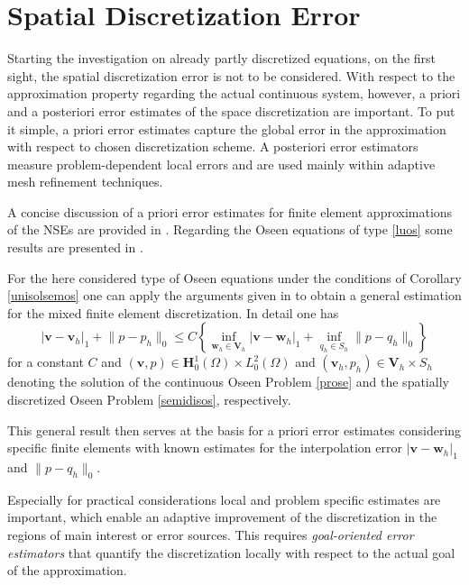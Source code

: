\documentclass[a4paper,10pt,BCOR=15mm]{scrbook}
\providecommand{\abs}[1]{\lvert#1\rvert}
\providecommand{\norm}[1]{\lVert#1 \rVert}
\begin{document}
\section{Spatial Discretization Error}
Starting the investigation on already partly discretized equations, on the first sight, the spatial discretization error is not to be considered. With respect to the approximation property regarding the actual continuous system, however, a priori and a posteriori error estimates of the space discretization are important. To put it simple, a priori error estimates capture the global error in the approximation with respect to chosen discretization scheme. A posteriori error estimators measure problem-dependent local errors and are used mainly within adaptive mesh refinement techniques.

A concise discussion of a priori error estimates for finite element approximations of the NSEs are provided in \cite[Ch. 4]{gira}. Regarding the Oseen equations of type \eqref{luos} some results are presented in \cite{cokasc}. 

For the here considered type of Oseen equations under the conditions of Corollary \ref{unisolsemos} one can apply the arguments given in \cite[Ch. 1, Thm 1.1.]{gira} to obtain a general estimation for the mixed finite element discretization. In detail one has
\begin{equation*}
 \abs{\mathbf v- \mathbf v_h}_1 + \norm{p-p_h}_0 \leq C \left \{ \inf_{\mathbf w_h \in \mathbf V_h} \abs{\mathbf v-\mathbf w_h}_1 + \inf_{q_h \in S_h}\norm{p - q_h}_0 \right \}
\end{equation*}
for a constant $C$ and $(\mathbf v,p) \in \mathbf H_0^1(\Omega) \times L_0^2(\Omega)$ and $(\mathbf v_h,p_h) \in \mathbf V_h \times S_h$ denoting the solution of the continuous Oseen Problem \ref{prose} and the spatially discretized Oseen Problem \ref{semidisos}, respectively.

This general result then serves at the basis for a priori error estimates considering specific finite elements with known estimates for the interpolation error $\abs{\mathbf v-\mathbf w_h}_1$ and $\norm{p - q_h}_0 $. 

Especially for practical considerations local and problem specific estimates are important, which enable an adaptive improvement of the discretization in the regions of main interest or error sources. This requires \textit{goal-oriented error estimators} that quantify the discretization locally with respect to the actual goal of the approximation. 
\end{document}
